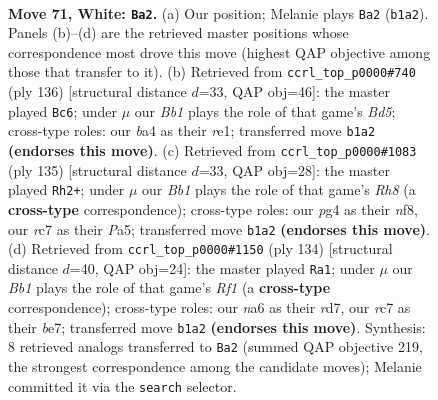 \documentclass[11pt]{article}
\begin{document}
\clearpage

\begin{figure}[p]\centering
\begin{subfigure}{0.46\textwidth}\centering
\resizebox{\linewidth}{!}{%
\newchessgame
\chessboard[
  setfen={8/2r2p2/n5p1/4P2p/b4Pp1/6N1/3k1K1P/1B6 w - - 0 71},
  showmover=false,
  pgfstyle=straightmove, color=movearrow, markmove={b1-a2}
]}
\caption{}
\end{subfigure}\hfill
\begin{subfigure}{0.46\textwidth}\centering
\resizebox{\linewidth}{!}{%
\newchessgame
\chessboard[
  setfen={8/5pk1/1p4p1/3B3p/P4N1P/6P1/7K/4r3 w - - 1 69},
  showmover=false,
  pgfstyle=straightmove, color=movearrow, markmove={d5-c6}
]}
\caption{}
\end{subfigure}
\\[4pt]
\begin{subfigure}{0.46\textwidth}\centering
\resizebox{\linewidth}{!}{%
\newchessgame
\chessboard[
  setfen={5N2/8/5p1k/p1p4p/P2n3P/1P4R1/K7/7r b - - 9 68},
  showmover=false,
  pgfstyle=straightmove, color=movearrow, markmove={h1-h2}
]}
\caption{}
\end{subfigure}\hfill
\begin{subfigure}{0.46\textwidth}\centering
\resizebox{\linewidth}{!}{%
\newchessgame
\chessboard[
  setfen={8/3rb3/6k1/1pp4p/3p4/1P1P2NK/2P5/5R2 w - - 3 68},
  showmover=false,
  pgfstyle=straightmove, color=movearrow, markmove={f1-a1}
]}
\caption{}
\end{subfigure}
\caption{\textbf{Move 71, White: \texttt{Ba2}.} (a) Our position; Melanie plays \texttt{Ba2} (\texttt{b1a2}). Panels (b)--(d) are the retrieved master positions whose correspondence most drove this move (highest QAP objective among those that transfer to it). (b) Retrieved from \texttt{ccrl\_top\_p0000\#740} (ply 136) [structural distance $d$=33, QAP obj=46]: the master played \texttt{Bc6}; under $\mu$ our \emph{Bb1} plays the role of that game's \emph{Bd5}; cross-type roles: our \emph{b}a4 as their \emph{r}e1; transferred move \texttt{b1a2} \textbf{(endorses this move)}. (c) Retrieved from \texttt{ccrl\_top\_p0000\#1083} (ply 135) [structural distance $d$=33, QAP obj=28]: the master played \texttt{Rh2+}; under $\mu$ our \emph{Bb1} plays the role of that game's \emph{Rh8} (a \textbf{cross-type} correspondence); cross-type roles: our \emph{p}g4 as their \emph{n}f8, our \emph{r}c7 as their \emph{P}a5; transferred move \texttt{b1a2} \textbf{(endorses this move)}. (d) Retrieved from \texttt{ccrl\_top\_p0000\#1150} (ply 134) [structural distance $d$=40, QAP obj=24]: the master played \texttt{Ra1}; under $\mu$ our \emph{Bb1} plays the role of that game's \emph{Rf1} (a \textbf{cross-type} correspondence); cross-type roles: our \emph{n}a6 as their \emph{r}d7, our \emph{r}c7 as their \emph{b}e7; transferred move \texttt{b1a2} \textbf{(endorses this move)}. Synthesis: 8 retrieved analogs transferred to \texttt{Ba2} (summed QAP objective 219, the strongest correspondence among the candidate moves); Melanie committed it via the \texttt{search} selector.}
\label{fig:thought-m140}
\end{figure}
\end{document}
